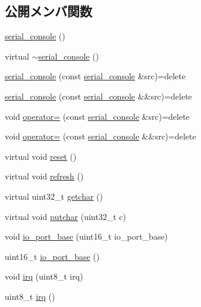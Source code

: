 \subsection*{公開メンバ関数}
\begin{DoxyCompactItemize}
\item 
\hyperlink{classserial__console_a5cbd8276bd1ca301c3d148a141d3b72a}{serial\+\_\+console} ()
\item 
virtual \hyperlink{classserial__console_ad3a4f9f197191a6fa40f2098087d9ed3}{$\sim$serial\+\_\+console} ()
\item 
\hyperlink{classserial__console_ab4ff2b180736394d4f90b8165ce5277b}{serial\+\_\+console} (const \hyperlink{classserial__console}{serial\+\_\+console} \&src)=delete
\item 
\hyperlink{classserial__console_a3882a2706380db177d22d44cef4db227}{serial\+\_\+console} (const \hyperlink{classserial__console}{serial\+\_\+console} \&\&src)=delete
\item 
void \hyperlink{classserial__console_a3c252fd567fb159b89225b86215da61f}{operator=} (const \hyperlink{classserial__console}{serial\+\_\+console} \&src)=delete
\item 
void \hyperlink{classserial__console_acc5cf17db660a0ff98f3e96f6ef23ca1}{operator=} (const \hyperlink{classserial__console}{serial\+\_\+console} \&\&src)=delete
\item 
virtual void \hyperlink{classserial__console_a86f0ff28692c55debc2f39d3175fc52e}{reset} ()
\item 
virtual void \hyperlink{classserial__console_ab652d9c5c8122739dfa377625f457333}{refresh} ()
\item 
virtual uint32\+\_\+t \hyperlink{classserial__console_a63393073ee917b8d5ecd04922e8b0219}{getchar} ()
\item 
virtual void \hyperlink{classserial__console_aa75329918015828987a4327d183e82fc}{putchar} (uint32\+\_\+t c)
\item 
void \hyperlink{classserial__console_a7997c59282c7c6646453496b32b62f71}{io\+\_\+port\+\_\+base} (uint16\+\_\+t io\+\_\+port\+\_\+base)
\item 
uint16\+\_\+t \hyperlink{classserial__console_a8f5ba5b33eeb7b126c23f48300949ae6}{io\+\_\+port\+\_\+base} ()
\item 
void \hyperlink{classserial__console_a649deaac8973408643de56bbe1438890}{irq} (uint8\+\_\+t irq)
\item 
uint8\+\_\+t \hyperlink{classserial__console_a286ec03d4c3b6d35c29ac65c237741cd}{irq} ()
\item 

\end{DoxyCompactItemize}
